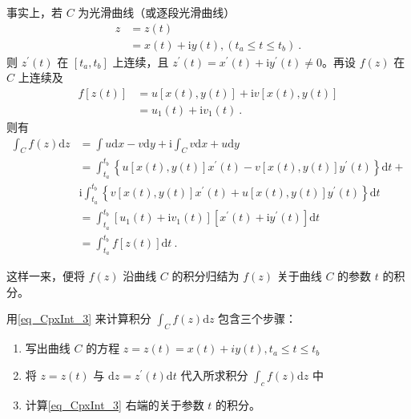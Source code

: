 事实上，若 $C$ 为光滑曲线（或逐段光滑曲线）
\begin{equation}
\begin{aligned} z &=z(t) \\ &=x(t)+\mathrm{i} y(t),(t_a \leqslant t \leqslant t_b)~. \end{aligned}
\end{equation}
则 $z^\prime(t)$ 在 $[t_a, t_b]$ 上连续，且 $z^\prime(t) = x^\prime(t) + \mathrm iy^\prime(t) \neq  0$。再设 $ f (z)$ 在 $C$ 上连续及
\begin{equation}
\begin{aligned} f[z(t)] &=u[x(t), y(t)]+\mathrm{i} v[x(t), y(t)] \\ &=u_{1}(t)+\mathrm{i} v_{1}(t)~. \end{aligned}
\end{equation}
则有
\begin{equation} \label{eq_CpxInt_3}
\begin{aligned} \int_{C} f(z) \mathrm{d} z &=\int u \mathrm{d} x-v \mathrm{d} y+\mathrm{i} \int_{C} v \mathrm{d} x+u \mathrm{d} y \\ &=\int_{t_a}^{t_b}\left\{u[x(t), y(t)] x^{\prime}(t)-v[x(t), y(t)] y^{\prime}(t)\right\} \mathrm{d} t+\\ & \mathrm{i} \int_{t_a}^{t_b}\left\{v[x(t), y(t)] x^{\prime}(t)+u[x(t), y(t)] y^{\prime}(t)\right\} \mathrm{d} t \\ &=\int_{t_a}^{t_b}\left[u_{1}(t)+\mathrm{i} v_{1}(t)\right]\left[x^{\prime}(t)+\mathrm{i} y^{\prime}(t)\right] \mathrm{d} t \\ &=\int_{t_a}^{t_b} f[z(t)] \mathrm{d} t ~.\end{aligned}
\end{equation}

这样一来，便将 $ f (z)$ 沿曲线 $C$ 的积分归结为 $ f (z)$ 关于曲线 $C$ 的参数 $t$ 的积分。

用\autoref{eq_CpxInt_3} 来计算积分 $\displaystyle \int_{C} f(z) \mathrm{d} z$ 包含三个步骤：
\begin{enumerate}
\item 写出曲线 $C$ 的方程 $z=z(t)=x(t)+i y(t), t_a \leqslant t \leqslant t_b$
\item 将 $ z = z(t)$ 与 $\mathrm{d}z = z^\prime (t)\mathrm{d}t $ 代入所求积分 $\displaystyle \int_{c} f(z) \mathrm{d} z$ 中
\item 计算\autoref{eq_CpxInt_3} 右端的关于参数 $t$ 的积分。
\end{enumerate}

